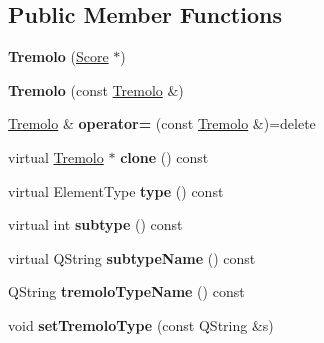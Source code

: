 \subsection*{Public Member Functions}
\begin{DoxyCompactItemize}
\item 
\mbox{\label{class_ms_1_1_tremolo_a281bd1f12f6c28a7ea7ed57743faa8bb}} 
{\bfseries Tremolo} (\hyperlink{class_ms_1_1_score}{Score} $\ast$)
\item 
\mbox{\label{class_ms_1_1_tremolo_abe6a983162d5320f9ca45d7590704a85}} 
{\bfseries Tremolo} (const \hyperlink{class_ms_1_1_tremolo}{Tremolo} \&)
\item 
\mbox{\label{class_ms_1_1_tremolo_aeec5d84e07f06f8b2bc6880dd7a9c723}} 
\hyperlink{class_ms_1_1_tremolo}{Tremolo} \& {\bfseries operator=} (const \hyperlink{class_ms_1_1_tremolo}{Tremolo} \&)=delete
\item 
\mbox{\label{class_ms_1_1_tremolo_a6159502c4ad78427e6099e31d09d3f66}} 
virtual \hyperlink{class_ms_1_1_tremolo}{Tremolo} $\ast$ {\bfseries clone} () const
\item 
\mbox{\label{class_ms_1_1_tremolo_a8929347ae2f70b89213cce8f88a0cbec}} 
virtual Element\+Type {\bfseries type} () const
\item 
\mbox{\label{class_ms_1_1_tremolo_a173c56c98e55af21f05663eb2c0a60d2}} 
virtual int {\bfseries subtype} () const
\item 
\mbox{\label{class_ms_1_1_tremolo_a4ad9603c91c5b6cd3ed506ab6ebfd4d1}} 
virtual Q\+String {\bfseries subtype\+Name} () const
\item 
\mbox{\label{class_ms_1_1_tremolo_ab4fdb153364b858b430f24a26ae62471}} 
Q\+String {\bfseries tremolo\+Type\+Name} () const
\item 
\mbox{\label{class_ms_1_1_tremolo_a3fdadf886a4866faa39db71ce499b416}} 
void {\bfseries set\+Tremolo\+Type} (const Q\+String \&s)
\item 
\mbox{\label{class_ms_1_1_tremolo_a1abc92c0d4a32a0fc905da22dac303d9}} 

\end{DoxyCompactItemize}
